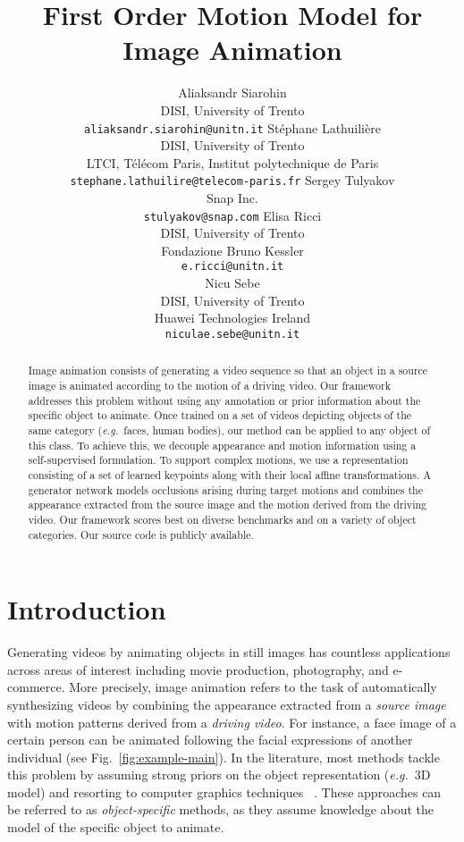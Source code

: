 \documentclass{article}
\title{First Order Motion Model for Image Animation}
\author{
Aliaksandr Siarohin\\
DISI, University of Trento\\
\texttt{aliaksandr.siarohin@unitn.it}
\And
St{\'e}phane Lathuili{\`e}re\\
DISI, University of Trento\\
LTCI, Télécom Paris, Institut polytechnique de Paris\\
\texttt{stephane.lathuilire@telecom-paris.fr}
\And
Sergey Tulyakov\\
Snap Inc.\\
\texttt{stulyakov@snap.com}
\And
Elisa Ricci\\
DISI, University of Trento\\
Fondazione Bruno Kessler\\
\texttt{e.ricci@unitn.it}\\
\And
Nicu Sebe\\
DISI, University of Trento\\
Huawei Technologies Ireland\\
\texttt{niculae.sebe@unitn.it}\\
}
\def\eg{\textit{e.g.}}
\begin{document}
\maketitle

\begin{abstract}
Image animation consists of generating a video sequence so that an object in a source image is animated according to the motion of a driving video.
Our framework addresses this problem without using any annotation or prior information about the specific object to animate. Once trained on a set of videos depicting objects of the same category (\eg \ faces, human bodies), our method can be applied to any object of this class. 
   To achieve this, we decouple appearance and motion information using a self-supervised formulation. To support complex motions, we use a representation consisting of a set of learned keypoints along with their local affine transformations. A generator network models occlusions arising during target motions and combines the appearance extracted from the source image and the motion derived from the driving video. Our framework scores best on diverse benchmarks and on a variety of object categories. Our source code is publicly  available\footnotemark[1].
\end{abstract}


\vspace{-0.2cm}
\section{Introduction}
\vspace{-0.2cm}


Generating videos by animating objects in still images has countless applications across areas of interest including movie production, photography, and e-commerce.  
More precisely, image animation refers to the task of automatically synthesizing videos by combining the appearance extracted from a \textit{source image}
 with motion patterns derived from a \textit{driving video}. For instance, a face image of a certain person can be animated following the facial expressions of another individual (see Fig.~\ref{fig:example-main}). In the literature, most methods tackle this problem by
assuming strong priors on the object representation (\eg \ 3D model) \cite{blanz1999morphable} and resorting to computer graphics techniques ~\cite{cao2014displaced,thies2016face2face}. These approaches can be referred to as \textit{object-specific} methods, as they assume knowledge about the model of the specific object to animate.
\end{document}
